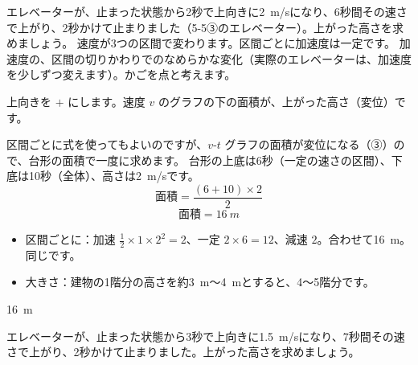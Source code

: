\begin{lrbox}{\pxbplota}\end{lrbox}%
\begin{phreidai}
\label{ph:力-1:ex7}エレベーターが、止まった状態から2秒で上向きに\qty{2}{m/s}になり、6秒間その速さで上がり、2秒かけて止まりました（\mbox{5-5③}のエレベーター）。上がった高さを求めましょう。
\phbamen
速度が3つの区間で変わります。区間ごとに加速度は一定です。
\phmushi
加速度の、区間の切りかわりでのなめらかな変化（実際のエレベーターは、加速度を少しずつ変えます）。かごを点と考えます。
\phzu
\noindent\begin{minipage}[c]{0.55\linewidth}\centering
\usebox{\pxbplota}
\end{minipage}\hfill
\begin{minipage}[c]{0.42\linewidth}
上向きを $+$ にします。速度 $v$ のグラフの下の面積が、上がった高さ（変位）です。
\end{minipage}
\phriyu
区間ごとに式を使ってもよいのですが、$v$-$t$ グラフの面積が変位になる（③）ので、台形の面積で一度に求めます。
\phtateru
台形の上底は6秒（一定の速さの区間）、下底は10秒（全体）、高さは\qty{2}{m/s}です。
\[ \text{面積}=\frac{(6+10)\times2}{2} \]
\phtoku
\[ \text{面積}=\qty{16}{m} \]
\phtashikame
\begin{itemize}[leftmargin=1.2\zw, itemsep=1pt, topsep=1pt, label={\color{bkTheme}●}]
\item 区間ごとに：加速 $\tfrac{1}{2}\times1\times2^2=2$、一定 $2\times6=12$、減速 $2$。合わせて\qty{16}{m}。同じです。
\item 大きさ：建物の1階分の高さを約\qty{3}{m}〜\qty{4}{m}とすると、4〜5階分です。
\end{itemize}
\kotae \qty{16}{m}
\end{phreidai}
\begin{jibun}
エレベーターが、止まった状態から3秒で上向きに\qty{1.5}{m/s}になり、7秒間その速さで上がり、2秒かけて止まりました。上がった高さを求めましょう。
\end{jibun}

